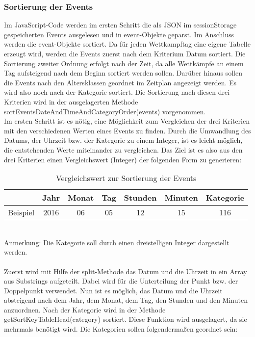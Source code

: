 \subsubsection{Sortierung der Events}
Im JavaScript-Code werden im ersten Schritt die als JSON im sessionStorage gespeicherten Events ausgelesen und in event-Objekte geparst. Im Anschluss werden die event-Objekte sortiert. Da für jeden Wettkampftag eine eigene Tabelle erzeugt wird, werden die Events zuerst nach dem Kriterium Datum sortiert. Die Sortierung zweiter Ordnung erfolgt nach der Zeit, da alle Wettkämpfe an einem Tag aufsteigend nach dem Beginn sortiert werden sollen. Darüber hinaus sollen die Events nach den Altersklassen geordnet im Zeitplan angezeigt werden. Es wird also noch nach der Kategorie sortiert. Die Sortierung nach diesen drei Kriterien wird in der ausgelagerten Methode sortEventsDateAndTimeAndCategoryOrder(events) vorgenommen.\\
Im ersten Schritt ist es nötig, eine Möglichkeit zum Vergleichen der drei Kriterien mit den verschiedenen Werten eines Events zu finden. Durch die Umwandlung des Datums, der Uhrzeit bzw. der Kategorie zu einem Integer, ist es leicht möglich, die entstehenden Werte miteinander zu vergleichen. Das Ziel ist es also aus den drei Kriterien einen Vergleichswert (Integer) der folgenden Form zu generieren: 
\begin{table}[h]
\caption{Vergleichswert zur Sortierung der Events}
\begin{tabular}{|l||c|c|c|c|c|c|}
\hline
 & Jahr & Monat & Tag & Stunden & Minuten & Kategorie \\
\hline
Beispiel & 2016 & 06 & 05 & 12 & 15 & 116 \\
\hline
\end{tabular}
\label{tab: Vergleichswert zur Sortierung der Events}
\end{table} \\
Anmerkung: Die Kategorie soll durch einen dreistelligen Integer dargestellt werden.\\
\\
Zuerst wird mit Hilfe der split-Methode das Datum und die Uhrzeit in ein Array aus Substrings aufgeteilt. Dabei wird für die Unterteilung der Punkt bzw. der Doppelpunkt verwendet. Nun ist es möglich, das Datum und die Uhrzeit absteigend nach dem Jahr, dem Monat, dem Tag, den Stunden und den Minuten anzuordnen. 
Nach der Kategorie wird in der Methode getSortKeyTableHead(category) sortiert. Diese Funktion wird ausgelagert, da sie mehrmals benötigt wird. Die Kategorien sollen folgendermaßen geordnet sein: \\
